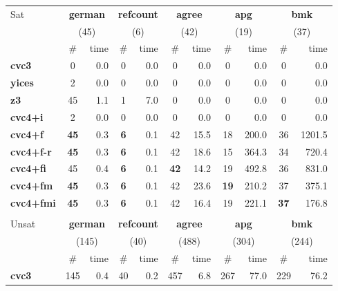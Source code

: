 \documentclass{svjour3}                     %
\begin{document}
\begin{figure}[t]
\scriptsize
\centering
\begin{tabular}{|l|c|r|c|r|c|r|c|r|c|r|}
\hline
Sat & \multicolumn{2}{c|}{\bf german} & \multicolumn{2}{c|}{\bf refcount} & \multicolumn{2}{c|}{\bf agree} & \multicolumn{2}{c|}{\bf apg} & \multicolumn{2}{c|}{\bf bmk}
\\
 & \multicolumn{2}{c|}{(45)} & \multicolumn{2}{c|}{(6)} & \multicolumn{2}{c|}{(42)} & \multicolumn{2}{c|}{(19)} & \multicolumn{2}{c|}{(37)}
\\
\hline
  & \# & time & \# & time & \# & time & \# & time & \# & time
\\
\hline
{\bf cvc3} & 0 & 0.0 & 0 & 0.0 & 0 & 0.0 & 0 & 0.0 & 0 & 0.0
\\
{\bf yices} & 2 & 0.0 & 0 & 0.0 & 0 & 0.0 & 0 & 0.0 & 0 & 0.0
\\
{\bf z3} & 45 & 1.1 & 1 & 7.0 & 0 & 0.0 & 0 & 0.0 & 0 & 0.0
\\
{\bf cvc4+i} & 2 & 0.0 & 0 & 0.0 & 0 & 0.0 & 0 & 0.0 & 0 & 0.0
\\
{\bf cvc4+f } & {\bf 45} & 0.3 & {\bf 6} & 0.1 & 42 & 15.5 & 18 & 200.0 & 36 & 1201.5
\\
{\bf cvc4+f-r } & {\bf 45} & 0.3 & {\bf 6} & 0.1 & 42 & 18.6 & 15 & 364.3 & 34 & 720.4
\\
{\bf cvc4+fi } & 45 & 0.4 & {\bf 6} & 0.1 & {\bf 42} & 14.2 & 19 & 492.8 & 36 & 831.0
\\
{\bf cvc4+fm } & {\bf 45} & 0.3 & {\bf 6} & 0.1 & 42 & 23.6 & {\bf 19} & 210.2 & 37 & 375.1
\\
{\bf cvc4+fmi } & {\bf 45} & 0.3 & {\bf 6} & 0.1 & 42 & 16.4 & 19 & 221.1 & {\bf 37} & 176.8
\\
\hline
%
%
\multicolumn{11}{c}{}
\\[-1ex]
\hline
Unsat & \multicolumn{2}{c|}{\bf german} & \multicolumn{2}{c|}{\bf refcount} & \multicolumn{2}{c|}{\bf agree} & \multicolumn{2}{c|}{\bf apg} & \multicolumn{2}{c|}{\bf bmk}
\\
 & \multicolumn{2}{c|}{(145)} & \multicolumn{2}{c|}{(40)} & \multicolumn{2}{c|}{(488)} & \multicolumn{2}{c|}{(304)} & \multicolumn{2}{c|}{(244)}
\\
\hline
 & \# & time & \# & time & \# & time & \# & time & \# & time
\\
\hline
{\bf cvc3} & 145 & 0.4 & 40 & 0.2 & 457 & 6.8 & 267 & 77.0 & 229 & 76.2
\\

\end{tabular}
\end{figure}
\end{document}
